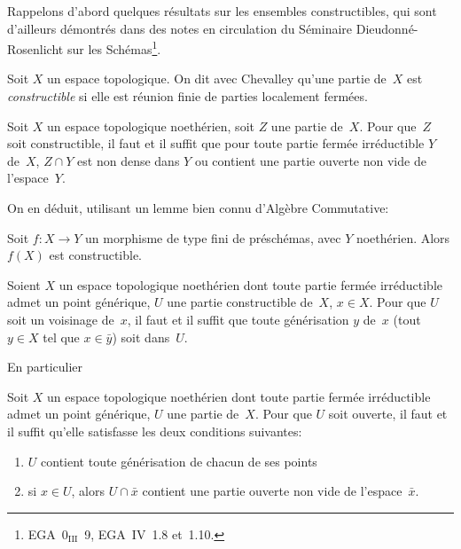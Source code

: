 Rappelons d'abord quelques r\'esultats sur les ensembles
constructibles, qui sont d'ailleurs d\'emontr\'es dans des notes
en circulation du S\'eminaire Dieudonn\'e-Rosenlicht sur les
Sch\'emas\footnote{\Cf EGA~0$_\mathrm{III}$~9, EGA~IV~1.8 et~1.10.}.

Soit $X$ un espace topologique. On dit avec Chevalley qu'une partie
de~$X$ est \emph{constructible}
si elle est r\'eunion finie de parties localement ferm\'ees.

\begin{lemme}
\label{IV.6.1}
Soit $X$ un espace topologique noeth\'erien, soit $Z$ une partie
de~$X$. Pour que~$Z$ soit constructible, il faut et il suffit que
pour toute partie ferm\'ee irr\'eductible $Y$ de~$X$, $Z\cap Y$
est non dense dans $Y$ ou contient une partie ouverte non vide de
l'espace~$Y$.
\end{lemme}

On en d\'eduit, utilisant un lemme bien connu d'Alg\`ebre
Commutative:

\begin{lemme}[Chevalley]
\label{IV.6.2}
Soit $f\colon X\to Y$ un morphisme de type fini de
pr\'esch\'emas, avec $Y$ noeth\'erien. Alors $f(X)$ est
constructible.
\end{lemme}

\begin{lemme}
\label{IV.6.3}
Soient $X$ un espace topologique noeth\'erien dont toute partie
ferm\'ee irr\'eductible admet un point g\'en\'erique, $U$ une
partie constructible de~$X$, $x\in X$. Pour que $U$ soit un voisinage
de~$x$, il faut et il suffit que toute g\'en\'erisation $y$ de~$x$
(\ie tout $y\in X$ tel que $x\in \bar{y}$) soit dans~$U$.
\end{lemme}

En particulier

\begin{corollaire}
\label{IV.6.4}
Soit $X$ un espace topologique noeth\'erien dont toute partie
ferm\'ee irr\'eductible admet un point g\'en\'erique, $U$ une
partie de~$X$. Pour que $U$ soit ouverte, il faut et il suffit
qu'elle satisfasse les deux conditions suivantes:
\begin{enumerate}
\item[(a)] $U$ contient toute g\'en\'erisation de chacun de ses
points
\item[(b)] si $x\in U$, alors
$U\cap\bar{x}$ contient une partie ouverte non vide de
l'espace~$\bar{x}$.
\end{enumerate}
\end{corollaire}

